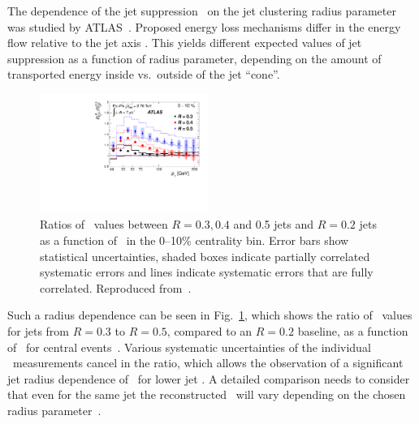 The dependence of the jet suppression \Rcp\ on the jet clustering radius parameter
was studied by ATLAS~\cite{Aad:2012is}. Proposed energy loss mechanisms differ
in the energy flow relative to the jet axis \cite{Vitev:2008rz, Vitev:2009rd,
He:2011pd}. This yields different expected values of jet suppression as a
function of radius parameter, depending on the amount of transported energy
inside vs.\ outside of the jet ``cone''.
\begin{figure}[!th]
\begin{center}
\includegraphics[width=0.49\textwidth]{jetfigures/ATLAS_jetRCP_size.pdf}
\caption{
Ratios of \Rcp\ values between $R = 0.3, 0.4$ and 0.5 jets and $R =
0.2$ jets as a function of \pT\ in the 0--10\% centrality bin.
Error bars show statistical uncertainties, shaded boxes
indicate partially correlated systematic errors and lines indicate
systematic errors that are fully correlated.
Reproduced from~\cite{Aad:2012is}.
}
\label{fig:GR:ATLAS_jetRCP_size}
\end{center}
\end{figure}

Such a radius dependence can be seen in Fig.~\ref{fig:GR:ATLAS_jetRCP_size}, which
shows the ratio of \Rcp\ values for jets from $R=0.3$ to $R=0.5$, compared
to an $R = 0.2$ baseline, as a function of \pT\ for central events~\cite{Aad:2012is}.
Various systematic uncertainties of the individual \Rcp\ measurements
cancel in the ratio, which allows the observation of a significant jet radius
dependence of \Rcp\ for lower jet \pT. A detailed comparison needs to consider
that even for the same jet the reconstructed \pT\ will vary
depending on the chosen radius parameter~\cite{Aad:2012is}.


